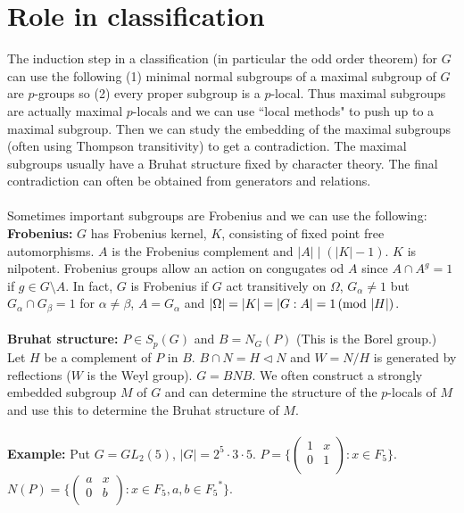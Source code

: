 \section {Role in classification}
The induction step in a classification (in particular the odd order theorem) for $G$ can use the following (1) minimal normal subgroups of a maximal
subgroup of $G$ are $p$-groups so (2) every proper subgroup is a $p$-local.  Thus maximal subgroups are actually maximal
$p$-locals and we can use ``local methods" to push up to a maximal subgroup.  Then we can study the embedding of the maximal subgroups
(often using Thompson transitivity) to get a contradiction.  The maximal subgroups usually have a Bruhat structure fixed by character
theory.  The final contradiction can often be obtained from generators and relations.
\\
\\
Sometimes important subgroups are Frobenius and we can use the following:
{\bf Frobenius:} $G$ has Frobenius kernel, $K$, consisting of fixed point free automorphisms.  $A$ is the Frobenius complement
and $|A| \mid (|K|-1)$.  $K$ is nilpotent.  Frobenius groups allow an action on congugates od $A$ since $A \cap A^g=1$ if $g \in G \setminus A$.
In fact, $G$ is Frobenius if $G$ act transitively on $\Omega$, $G_{\alpha} \neq 1$ but $G_{\alpha} \cap G_{\beta} = 1$ for
$\alpha \neq \beta$, $A = G_{\alpha}$ and $|\Omega| = |K| = |G:A| =1 \thinspace \textnormal{(mod } |H| \textnormal{)}$.
\\
\\
{\bf Bruhat structure:} $P \in S_p(G)$ and $B = N_G(P)$ (This is the Borel group.)  Let $H$ be a complement of $P$ in $B$.
$B \cap N =H \lhd N$ and $W = N/H$ is generated by reflections ($W$ is the Weyl group).  $G =BNB$.  We often construct a
strongly embedded subgroup $M$ of $G$ and can determine the structure of the $p$-locals of $M$ and use this to determine the
Bruhat structure of $M$.
\\
\\
{\bf Example:} Put $G=GL_2(5)$, $|G|= 2^5 \cdot 3 \cdot 5$.  $P = \{
\left(
\begin{array}{cc}
1 &  x \\
0 &  1\\
\end{array}
\right)
 : x \in F_5 \}$.
$N(P) = \{
\left(
\begin{array}{cc}
a &  x \\
0 &  b\\
\end{array}
\right) : x \in F_5, a, b \in {F_5}^* \}$.
